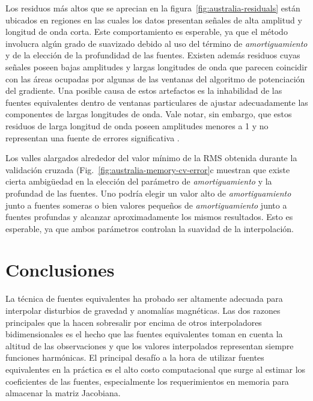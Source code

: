 Los residuos más altos que se aprecian en la figura~\ref{fig:australia-residuals}
están ubicados en regiones en las cuales los datos presentan señales de alta
amplitud y longitud de onda corta.
Este comportamiento es esperable, ya que el método involucra algún grado de
suavizado debido al uso del término de \emph{amortiguamiento} y de la elección
de la profundidad de las fuentes.
Existen además residuos cuyas señales poseen bajas amplitudes y largas
longitudes de onda que parecen coincidir con las áreas ocupadas por algunas de
las ventanas del algoritmo de potenciación del gradiente.
Una posible causa de estos artefactos es la inhabilidad de las fuentes
equivalentes dentro de ventanas particulares de ajustar adecuadamente
las componentes de largas longitudes de onda.
Vale notar, sin embargo, que estos residuos de larga longitud de onda poseen
amplitudes menores a 1\mGal{} y no representan una fuente de errores
significativa .

Los valles alargados alrededor del valor mínimo de la \ac{RMS} obtenida durante
la validación cruzada
(Fig.~\ref{fig:australia-memory-cv-error}c muestran que existe cierta
ambigüedad en la elección del parámetro de \emph{amortiguamiento} y la
profundad de las fuentes.
Uno podría elegir un valor alto de \emph{amortiguamiento} junto a fuentes
someras o bien valores pequeños de \emph{amortiguamiento} junto a fuentes
profundas y alcanzar aproximadamente los mismos resultados.
Esto es esperable, ya que ambos parámetros controlan la suavidad de la
interpolación.


\section{Conclusiones}

La técnica de fuentes equivalentes ha probado ser altamente adecuada para
interpolar disturbios de gravedad y anomalías magnéticas.
Las dos razones principales que la hacen sobresalir por encima de otros
interpoladores bidimensionales es el hecho que las fuentes equivalentes toman
en cuenta la altitud de las observaciones y que los valores interpolados
representan siempre funciones harmónicas.
El principal desafío a la hora de utilizar fuentes equivalentes en la práctica
es el alto costo computacional que surge al estimar los coeficientes de las
fuentes, especialmente los requerimientos en memoria para almacenar la matriz
Jacobiana.

